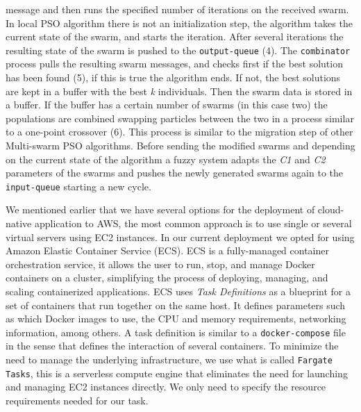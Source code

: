 \documentclass{cys}
\begin{document}
message and then runs the specified number of iterations on the received swarm. In 
local PSO algorithm there is not an initialization step, the algorithm takes the 
current state of the swarm, and starts the iteration. After several iterations the 
resulting state of the swarm is pushed to the \texttt{output-queue} (4). The \texttt{combinator} process pulls the resulting swarm 
messages, and checks first if the best solution has been found (5), if this is true the algorithm ends.  
If not, the best solutions are kept in a buffer with the best \emph{k} individuals. 
Then the swarm data is stored in a buffer. If the buffer has a certain number of 
swarms (in this case two) the populations are combined swapping particles between 
the two in a process similar to a one-point crossover (6). This process is similar 
to the migration step of other Multi-swarm PSO algorithms. Before sending the 
modified swarms and depending on the current state of the algorithm a fuzzy 
system adapts the \emph{C1} and \emph{C2} parameters of the swarms and pushes 
the newly generated swarms again to the \texttt{input-queue} starting a new cycle. 

We mentioned earlier that we have several options for the deployment of cloud-native 
application to AWS, the most common approach is to use single or several virtual servers 
using EC2 instances. In our current deployment we opted for using Amazon Elastic Container Service (ECS). 
ECS is a fully-managed container orchestration service, it allows the user to run, 
stop, and manage Docker containers on a cluster, simplifying the process of deploying, managing,
and scaling containerized applications. ECS uses \textit{Task Definitions} as a blueprint for a set of 
containers that run together on the same host. It defines parameters such as which Docker 
images to use, the CPU and memory requirements, networking information, among others.   
A task definition is similar to a \texttt{docker-compose} file in the sense that 
defines the interaction of several containers. To minimize the need to manage the
underlying infrastructure, we use what is called \texttt{Fargate Tasks}, this is a serverless
compute engine that eliminates the need for launching and managing EC2 instances directly. 
We only need to specify the resource requirements needed for our task. 
\end{document}
